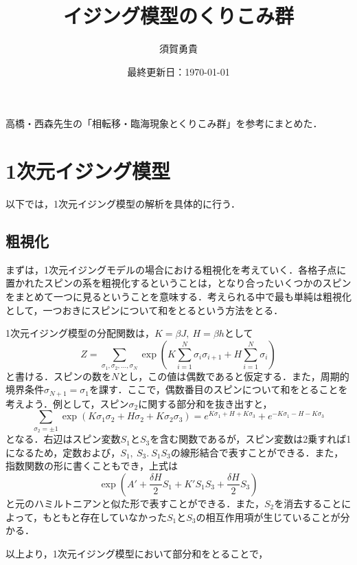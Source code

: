 \documentclass[a4paper,11pt]{jsarticle}
\begin{document}
\title{イジング模型のくりこみ群}
\author{須賀勇貴}
\date{最終更新日：\today}
\maketitle
高橋・西森先生の「相転移・臨海現象とくりこみ群」を参考にまとめた．
\vspace{0.5cm}

\section{1次元イジング模型}
以下では，1次元イジング模型の解析を具体的に行う．
\subsection{粗視化}
まずは，1次元イジングモデルの場合における粗視化を考えていく．各格子点に置かれたスピンの系を粗視化するということは，となり合ったいくつかのスピンをまとめて一つに見るということを意味する．考えられる中で最も単純は粗視化として，一つおきにスピンについて和をとるという方法をとる．\par
1次元イジング模型の分配関数は，$K=\beta J, \ H = \beta h$として
\begin{equation}
  Z = \sum_{\sigma_1,\sigma_2,\dots,\sigma_N} \exp{\left( K\sum_{i=1}^{N} \sigma_{i}\sigma_{i+1}
    + H \sum_{i=1}^{N} \sigma_i \right)}
\end{equation}
と書ける．スピンの数を$N$とし，この値は偶数であると仮定する．また，周期的境界条件$\sigma_{N+1}=\sigma_{1}$を課す．ここで，偶数番目のスピンについて和をとることを考えよう．例として，スピン$\sigma_{2}$に関する部分和を抜き出すと，
\begin{equation}
  \sum_{\sigma_{2} = \pm 1} \exp{(K\sigma_1\sigma_2 + H\sigma_2 + K\sigma_2\sigma_3)}
  = e^{K\sigma_1 + H + K\sigma_3} + e^{-K\sigma_1 - H - K\sigma_3}
\end{equation}
となる．右辺はスピン変数$S_1$と$S_3$を含む関数であるが，スピン変数は2乗すれば1になるため，定数および，$S_1, \ S_3. \ S_1 S_3$の線形結合で表すことができる．また，指数関数の形に書くこともでき，上式は
\begin{equation}
  \exp{\left( A' + \frac{\delta H}{2}S_1 + K'S_1S_3 + \frac{\delta H}{2}S_3 \right)}
\end{equation}
と元のハミルトニアンと似た形で表すことができる．また，$S_2$を消去することによって，もともと存在していなかった$S_1$と$S_3$の相互作用項が生じていることが分かる．\par
以上より，1次元イジング模型において部分和をとることで，
\end{document}
